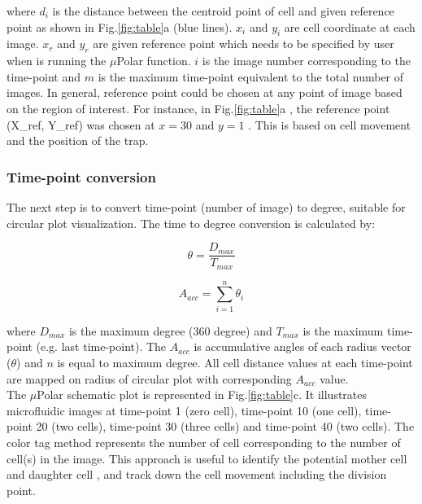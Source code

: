 \documentclass[conference]{IEEEtran}
\begin{document}
where $ d_i $ is the distance between the centroid point of cell and given reference point as shown in Fig.\ref{fig:table}a (blue lines). $ x_i $ and $ y_i $ are cell coordinate at each image. $ x_r $ and $ y_r $ are given reference point which needs to be specified by user when is running the $\mu$Polar function. $ i $ is the image number corresponding to the time-point and $ m $ is the maximum time-point equivalent to the total number of images. In general, reference point could be chosen at any point of image based on the region of interest. For instance, in Fig.\ref{fig:table}a , the reference point (X\_{ref}, Y\_{ref}) was chosen at $x = 30$ and $y = 1$ . This is based on cell movement and the position of the trap. 
\\

\subsubsection{Time-point conversion}
The next step is to convert time-point (number of image) to degree, suitable for circular plot visualization. The time to degree conversion is  calculated by: 

\begin{equation}
\theta = \frac{D_{max}} {T_{max}}
\end{equation}

\begin{equation}
A_{acc} = \sum_{i=1}^{n}{\theta_i}
\end{equation}

where $ D_{max} $ is the maximum degree (360 degree) and  $ T_{max} $ is the maximum time-point (e.g. last time-point). The  $ A_{acc} $ is accumulative angles of each radius vector ($\theta$) and $ n $ is equal to maximum degree. All cell distance values at each time-point are mapped on radius of circular plot with corresponding $A_{acc}$ value.
\\
The $\mu$Polar schematic plot is represented in Fig.\ref{fig:table}c. It illustrates microfluidic images at time-point 1 (zero cell), time-point 10 (one cell), time-point 20 (two cells), time-point 30 (three cells) and time-point 40 (two cells). The color tag method represents the number of cell corresponding to the number of cell(s) in the image. This approach is useful to identify the potential mother cell and daughter cell , and track down the cell movement including the division point. 
\end{document}
